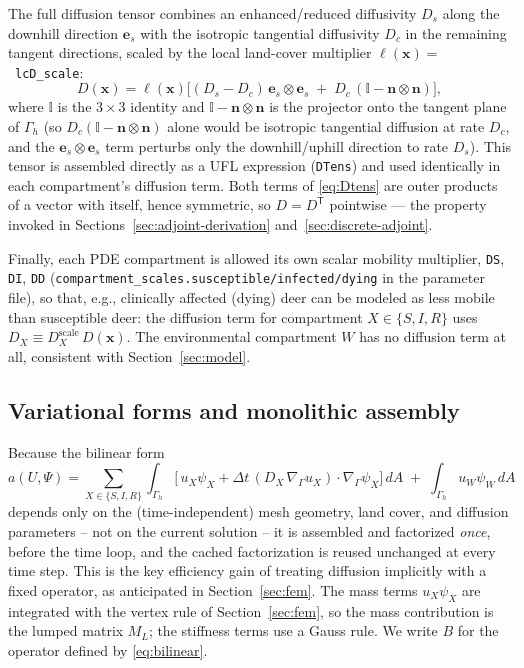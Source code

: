 \documentclass[11pt]{article}
\newcommand{\Grad}{\nabla_\Gamma}
\begin{document}
The full diffusion tensor combines an enhanced/reduced diffusivity $D_s$ along the downhill direction $\mathbf{e}_s$ with the isotropic tangential diffusivity $D_c$ in the remaining tangent directions, scaled by the local land-cover multiplier $\ell(\mathbf{x})=$~\texttt{lcD\_scale}:
\begin{equation}
D(\mathbf{x}) = \ell(\mathbf{x})\Big[(D_s-D_c)\,\mathbf{e}_s\otimes\mathbf{e}_s \;+\; D_c\,(\mathbb{I}-\mathbf{n}\otimes\mathbf{n})\Big],
\label{eq:Dtens}
\end{equation}
where $\mathbb{I}$ is the $3\times3$ identity and $\mathbb{I}-\mathbf{n}\otimes\mathbf{n}$ is the projector onto the tangent plane of $\Gamma_h$ (so $D_c(\mathbb{I}-\mathbf{n}\otimes\mathbf{n})$ alone would be isotropic tangential diffusion at rate $D_c$, and the $\mathbf{e}_s\otimes\mathbf{e}_s$ term perturbs only the downhill/uphill direction to rate $D_s$). This tensor is assembled directly as a UFL expression (\texttt{DTens}) and used identically in each compartment's diffusion term. Both terms of \eqref{eq:Dtens} are outer products of a vector with itself, hence symmetric, so $D=D^{\mathsf T}$ pointwise --- the property invoked in Sections~\ref{sec:adjoint-derivation} and~\ref{sec:discrete-adjoint}.

Finally, each PDE compartment is allowed its own scalar mobility multiplier, \texttt{DS}, \texttt{DI}, \texttt{DD} (\texttt{compartment\_scales.susceptible/infected/dying} in the parameter file), so that, e.g., clinically affected (dying) deer can be modeled as less mobile than susceptible deer: the diffusion term for compartment $X\in\{S,I,R\}$ uses $D_X \equiv D_X^{\text{scale}}\,D(\mathbf{x})$. The environmental compartment $W$ has no diffusion term at all, consistent with Section~\ref{sec:model}.

\subsection{Variational forms and monolithic assembly}
\label{sec:monolithic}

Because the bilinear form
\begin{equation}
a(U,\Psi) = \sum_{X\in\{S,I,R\}} \int_{\Gamma_h}\Big[\,u_X \psi_X + \Delta t\,(D_X\,\Grad u_X)\cdot\Grad \psi_X\Big]\,dA \;+\; \int_{\Gamma_h} u_W \psi_W\, dA
\label{eq:bilinear}
\end{equation}
depends only on the (time-independent) mesh geometry, land cover, and diffusion parameters -- not on the current solution -- it is assembled and factorized \emph{once}, before the time loop, and the cached factorization is reused unchanged at every time step. This is the key efficiency gain of treating diffusion implicitly with a fixed operator, as anticipated in Section~\ref{sec:fem}. The mass terms $u_X\psi_X$ are integrated with the vertex rule of Section~\ref{sec:fem}, so the mass contribution is the lumped matrix $M_L$; the stiffness terms use a Gauss rule. We write $B$ for the operator defined by \eqref{eq:bilinear}.
\end{document}
